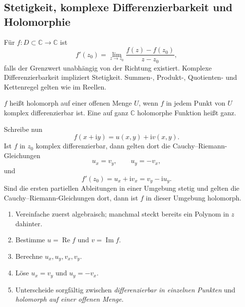\documentclass[11pt,a4paper]{article}
\newcommand{\C}{\mathbb C}
\newcommand{\ii}{\mathrm i}
\newcommand{\Ree}{\operatorname{Re}}
\newcommand{\Imm}{\operatorname{Im}}
\newcommand{\1}{\mathbf 1}
\begin{document}
\subsection{Stetigkeit, komplexe Differenzierbarkeit und Holomorphie}
Für $f:D\subset\C\to\C$ ist
\[
f'(z_0)=\lim_{z\to z_0}\frac{f(z)-f(z_0)}{z-z_0},
\]
falls der Grenzwert unabhängig von der Richtung existiert. Komplexe
Differenzierbarkeit impliziert Stetigkeit. Summen-, Produkt-, Quotienten- und Kettenregel
gelten wie im Reellen.

\begin{definitionbox}[title=Holomorph und ganz]
$f$ heißt holomorph auf einer offenen Menge $U$, wenn $f$ in jedem Punkt von $U$
komplex differenzierbar ist. Eine auf ganz $\C$ holomorphe Funktion heißt ganz.
\end{definitionbox}

Schreibe nun
\[
f(x+\ii y)=u(x,y)+\ii v(x,y).
\]
Ist $f$ in $z_0$ komplex differenzierbar, dann gelten dort die
Cauchy--Riemann-Gleichungen
\[
u_x=v_y,\qquad u_y=-v_x,
\]
und
\[
f'(z_0)=u_x+\ii v_x=v_y-\ii u_y.
\]
Sind die ersten partiellen Ableitungen in einer Umgebung stetig und gelten die
Cauchy--Riemann-Gleichungen dort, dann ist $f$ in dieser Umgebung holomorph.

\begin{kochrezeptbox}[title=Holomorphie mit Cauchy--Riemann prüfen]
\begin{enumerate}
\item Vereinfache zuerst algebraisch; manchmal steckt bereits ein Polynom in $z$ dahinter.
\item Bestimme $u=\Ree f$ und $v=\Imm f$.
\item Berechne $u_x,u_y,v_x,v_y$.
\item Löse $u_x=v_y$ und $u_y=-v_x$.
\item Unterscheide sorgfältig zwischen \emph{differenzierbar in einzelnen Punkten} und
\emph{holomorph auf einer offenen Menge}.
\end{enumerate}
\end{kochrezeptbox}
\end{document}
